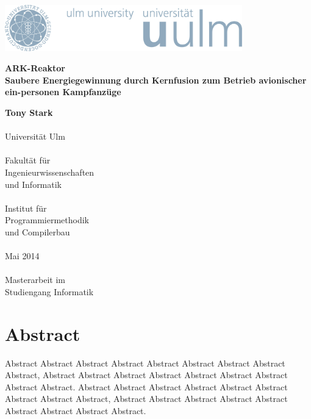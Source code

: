 \documentclass[a4paper,10pt
headsepline,           %
doubleside,            %
pointlessnumbers,      %
bibtotoc,              %
BCOR15mm,               %
leqno					%
]{scrbook}
\newcommand{\fullname}{Tony Stark}
\newcommand{\titel}{ARK-Reaktor}
\newcommand{\untertitel}{Saubere Energiegewinnung durch Kernfusion zum Betrieb avionischer ein-personen Kampfanzüge}
\newcommand{\abgabedatum}{Mai 2014}
\newcommand{\abschlussarbeit}{Masterarbeit}
\begin{document}
\frontmatter %


\begin{titlepage}
	\selectfont %
	\hfill\includegraphics[height=2.0cm]{images/logo_100_sRGB}\\[3.5cm] %
	\begin{flushright}
		\Huge \textbf{\titel}\\[0.2cm]
		\fontsize{19}{20}\selectfont \textbf{\untertitel}\\
	\end{flushright}
	
	\vfill\hfill
	\parbox[t]{4.6cm}{
		\singlespacing
		\large
		\textbf{\fullname}\\
		\\
		Universität Ulm\\
		\\
		Fakultät für\\
		Ingenieurwissenschaften\\
		und Informatik\\
		\\
		Institut für\\
		Programmiermethodik\\
		und Compilerbau\\
		\\
		\abgabedatum\\
		\\
		{\abschlussarbeit} im\\
		Studiengang Informatik
	}
\end{titlepage}
\restoregeometry


\clearpage
\thispagestyle{empty}
\chapter*{Abstract}

Abstract Abstract Abstract Abstract Abstract Abstract Abstract Abstract Abstract,
Abstract Abstract Abstract Abstract Abstract Abstract Abstract Abstract Abstract.
Abstract Abstract Abstract Abstract Abstract Abstract Abstract Abstract Abstract,
Abstract Abstract Abstract Abstract Abstract Abstract Abstract Abstract Abstract.
\end{document}
